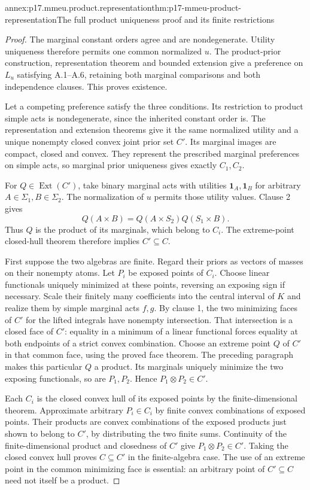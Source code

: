 \begin{annexitem}{annex:p17.mmeu.product.representation}{thm:p17-mmeu-product-representation}{The full product uniqueness proof and its finite restrictions}
\begin{proof}
The marginal constant orders agree
and are nondegenerate. Utility uniqueness
therefore permits one common normalized
\(u\). The product-prior construction,
representation theorem and bounded
extension give a preference on \(L_u\)
satisfying A.1--A.6, retaining both
marginal comparisons and both independence
clauses. This proves existence.

Let a competing preference satisfy
the three conditions. Its restriction
to product simple acts is nondegenerate,
since the inherited constant order is.
The representation and extension
theorems give it the same normalized
utility and a unique nonempty closed
convex joint prior set \(C'\).
Its marginal images are compact,
closed and convex. They represent
the prescribed marginal preferences
on simple acts, so marginal prior
uniqueness gives exactly \(C_1,C_2\).

For \(Q\in\operatorname{Ext}(C')\),
take binary marginal acts with
utilities \(\mathbf1_A,\mathbf1_B\)
for arbitrary \(A\in\Sigma_1,B\in\Sigma_2\).
The normalization of \(u\) permits
those utility values.
Clause 2 gives
\[
                Q(A\times B)
                   =Q(A\times S_2)Q(S_1\times B).
\]
Thus \(Q\) is the product of its
marginals, which belong to \(C_i\).
The extreme-point closed-hull theorem
therefore implies \(C'\subseteq C\).

First suppose the two algebras are
finite. Regard their priors as
vectors of masses on their nonempty
atoms. Let \(P_i\) be exposed
points of \(C_i\). Choose linear
functionals uniquely minimized at
these points, reversing an exposing
sign if necessary. Scale their
finitely many coefficients into
the central interval of \(K\)
and realize them by simple
marginal acts \(f,g\).
By clause 1, the two minimizing
faces of \(C'\) for the lifted
integrals have nonempty intersection.
That intersection is a closed
face of \(C'\): equality in a
minimum of a linear functional
forces equality at both endpoints
of a strict convex combination.
Choose an extreme point \(Q\)
of \(C'\) in that common face,
using the proved face theorem.
The preceding paragraph makes
this particular \(Q\) a product.
Its marginals uniquely minimize
the two exposing functionals,
so are \(P_1,P_2\). Hence
\(P_1\otimes P_2\in C'\).

Each \(C_i\) is the closed convex
hull of its exposed points by
the finite-dimensional theorem.
Approximate arbitrary \(P_i\in C_i\)
by finite convex combinations of
exposed points. Their products
are convex combinations of the
exposed products just shown to
belong to \(C'\), by distributing
the two finite sums. Continuity
of the finite-dimensional product
and closedness of \(C'\) give
\(P_1\otimes P_2\in C'\).
Taking the closed convex hull
proves \(C\subseteq C'\) in the
finite-algebra case.
The use of an extreme point in
the common minimizing face is
essential: an arbitrary point of
\(C'\subseteq C\) need not itself
be a product.


\end{proof}
\end{annexitem}
